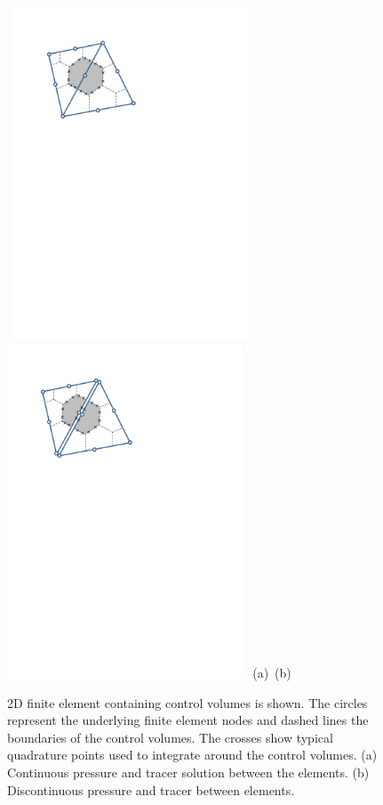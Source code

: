 \begin{figure}[H]
\vbox{
\hbox{
\hspace{0.cm}
\includegraphics[width=7.0cm,height=7.cm]{./doc_figures/p1dg-p2-elepic}
\hspace{-0.cm}
\includegraphics[width=7.0cm,height=7.cm]{./doc_figures/p1dg-p2-dgsat-elepic}
}
\vspace{-0.cm}
\hbox{\hspace{4.cm}(a) \hspace{6.5cm}(b)}
\vspace{-0.cm}}
\label{p1dgp2_ele-dgsat_pics}
\caption{2D finite element containing control volumes is shown. The circles represent the underlying finite element nodes and dashed lines the boundaries of the control volumes. The crosses show typical quadrature points used to integrate around the control volumes. (a) Continuous pressure and tracer solution between the elements. (b) Discontinuous pressure and tracer between elements.  }
\end{figure}

